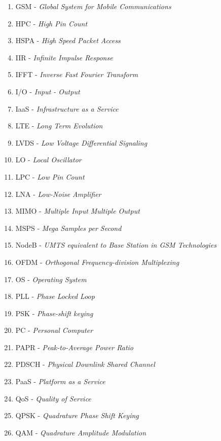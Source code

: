 \begin{enumerate}
  \item GSM - \textit{Global System for Mobile Communications}

  \item HPC - \textit{High Pin Count}
  \item HSPA - \textit{High Speed Packet Access}

  \item IIR - \textit{Infinite Impulse Response}
  \item IFFT - \textit{Inverse Fast Fourier Transform}
  \item I/O - \textit{Input - Output}
  \item IaaS - \textit{Infrastructure as a Service}



  \item LTE - \textit{Long Term Evolution}
  \item LVDS - \textit{Low Voltage Differential Signaling}
  \item LO - \textit{Local Oscillator}
  \item LPC - \textit{Low Pin Count}
  \item LNA - \textit{Low-Noise Amplifier}

  \item MIMO - \textit{Multiple Input Multiple Output}
  \item MSPS - \textit{Mega Samples per Second}

  \item NodeB - \textit{UMTS equivalent to Base Station in GSM Technologies}

  \item OFDM - \textit{Orthogonal Frequency-division Multiplexing}
  \item OS - \textit{Operating System}

  \item PLL - \textit{Phase Locked Loop}
  \item PSK - \textit{Phase-shift keying}
  \item PC - \textit{Personal Computer}
  \item PAPR - \textit{Peak-to-Average Power Ratio}
  \item PDSCH - \textit{Physical Downlink Shared Channel}
  \item PaaS - \textit{Platform as a Service}

  \item QoS - \textit{Quality of Service}
  \item QPSK - \textit{Quadrature Phase Shift Keying}
	\item QAM - \textit{Quadrature Amplitude Modulation}


\end{enumerate}
